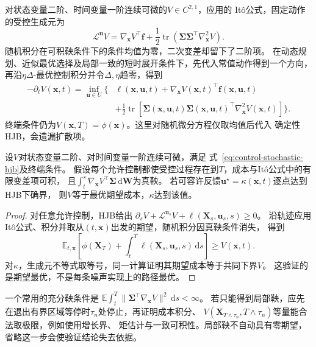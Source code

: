对状态变量二阶、时间变量一阶连续可微的$V\in C^{2,1}$，应用的
Itô公式，固定动作的受控生成元为
\[
  \mathcal L^{\bm u}V=
  \nabla_{\bm x}V^\top\bm f+
  \frac12\operatorname{tr}
    (\bm\Sigma\bm\Sigma^\top\nabla_{\bm x}^2V).
\]
随机积分在可积鞅条件下的条件均值为零，二次变差却留下了二阶项。
在动态规划、近似最优选择及局部一致的短时展开条件下，先代入常值动作得到一个方向，
再沿$\eta\Delta$-最优控制积分并令$\Delta,\eta$趋零，得到
\begin{equation}
  \begin{aligned}
  -\partial_tV(\bm x,t)=\inf_{\bm u\in U}\biggl\{&
    \ell(\bm x,\bm u,t)+
    \nabla_{\bm x}V(\bm x,t)^\top\bm f(\bm x,\bm u,t)\\
    &+\frac12\operatorname{tr}\!\left[
      \bm\Sigma(\bm x,\bm u,t)\bm\Sigma(\bm x,\bm u,t)^\top
      \nabla_{\bm x}^2V(\bm x,t)\right]\biggr\}.
  \end{aligned}
  \label{eq:control-stochastic-hjb}
\end{equation}
终端条件仍为$V(\bm x,T)=\phi(\bm x)$。这里对随机微分方程仅取均值后代入
确定性HJB，会遗漏扩散项。

\begin{theorem}[随机HJB验证]
\label{thm:control-stochastic-hjb-verification}
设$V$对状态变量二阶、对时间变量一阶连续可微，满足
式~\eqref{eq:control-stochastic-hjb}及终端条件。
假设每个允许控制都使受控过程存在到$T$，成本与Itô公式中的有限变差项可积，
且$\int_t^s\nabla_{\bm x}V^\top\bm\Sigma\,\mathrm d\bm W$为真鞅。
若可容许反馈$\bm u^\star=\kappa(\bm x,t)$逐点达到HJB下确界，
则$V$等于最优期望成本，$\kappa$达到该值。
\end{theorem}
\begin{proof}
对任意允许控制，HJB给出
$\partial_sV+\mathcal L^{\bm u_s}V+\ell(\bm X_s,\bm u_s,s)\geq0$。
沿轨迹应用Itô公式、积分并取从$(t,\bm x)$出发的期望，随机积分因真鞅条件消失，
得到
\[
  \mathbb E_{t,\bm x}\left[
    \phi(\bm X_T)+\int_t^T\ell(\bm X_s,\bm u_s,s)\,\mathrm ds\right]
  \geq V(\bm x,t).
\]
对$\kappa$，生成元不等式取等号，同一计算证明其期望成本等于共同下界$V$。
这验证的是期望最优，不是每条噪声实现上的路径最优。
\end{proof}

一个常用的充分鞅条件是
$\mathbb E\int_t^T\lVert\bm\Sigma^\top\nabla_{\bm x}V\rVert^2\,\mathrm ds<\infty$。
若只能得到局部鞅，应先在退出有界区域等停时$\tau_n$处停止，再证明成本积分、
$V(\bm X_{T\wedge\tau_n},T\wedge\tau_n)$等量能合法取极限，例如使用增长界、
矩估计与一致可积性。局部鞅不自动具有零期望，省略这一步会使验证结论失去依据。


